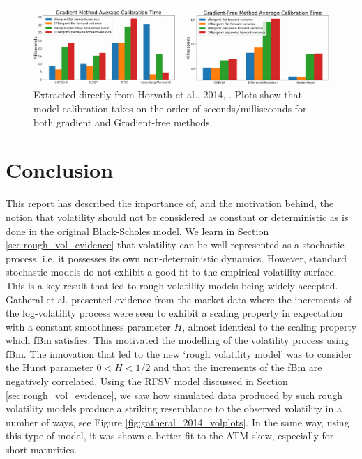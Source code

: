 \documentclass[12pt,oneside]{article}
\begin{document}
 \begin{figure}[htpb]
    \centering
    \includegraphics[width=1.0\textwidth ]{figs/Horvath2019_fig10_11}
    \caption{Extracted directly from Horvath et al., 2014, \cite[Figures~10\&11]{Horvath2019}. Plots show that model calibration takes on the order of seconds/milliseconds for both gradient and Gradient-free methods.}
    \label{fig:Horvath2019_fig10_11} 
\end{figure}

\section{Conclusion}
\label{sec:summary&futurework}
 
This report has described the importance of, and the motivation behind, the notion that volatility should not be considered as constant or deterministic as is done in the original Black-Scholes model. We learn in Section \ref{sec:rough_vol_evidence} that volatility can be well represented as a stochastic process, i.e. it possesses its own non-deterministic dynamics. However, standard stochastic models do not exhibit a good fit to the empirical volatility surface. This is a key result that led to rough volatility models being widely accepted.
\\

Gatheral et al. \cite{Gatheral2014} presented evidence from the market data where the increments of the log-volatility process were seen to exhibit a scaling property in expectation with a constant smoothness parameter $H$, almost identical to the scaling property which fBm satisfies. This motivated the modelling of the volatility process using fBm. The innovation that led to the new `rough volatility model' was to consider the Hurst parameter $0<H<1/2$ and that the increments of the fBm are negatively correlated. Using the RFSV model discussed in Section \ref{sec:rough_vol_evidence}, we saw how simulated data produced by such rough volatility models produce a striking resemblance to the observed volatility in a number of ways, see Figure \ref{fig:gatheral_2014_volplots}. In the same way, using this type of model, it was shown a better fit to the ATM skew, especially for short maturities.  
\\
\end{document}
